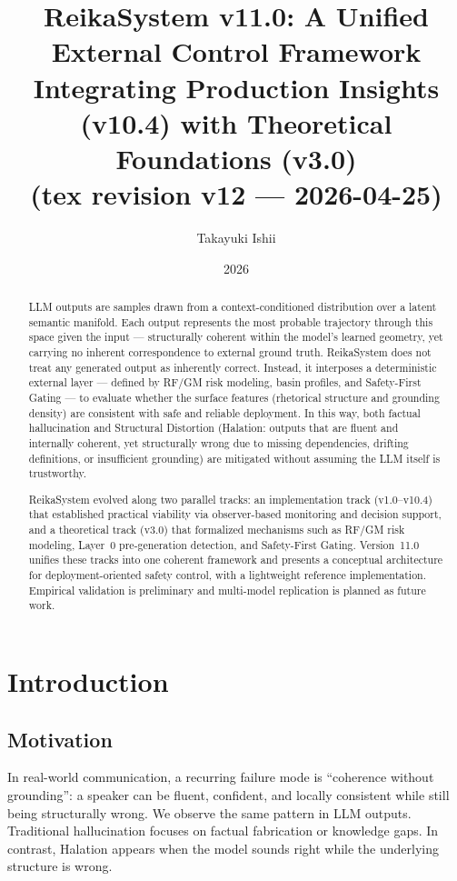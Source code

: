 \documentclass[11pt,a4paper]{article}
\title{ReikaSystem v11.0: A Unified External Control Framework\\
\large Integrating Production Insights (v10.4) with Theoretical Foundations (v3.0)
\\ \small (tex revision v12 --- 2026-04-25)}
\author{Takayuki Ishii}
\date{2026}
\begin{document}
\maketitle

\begin{abstract}
LLM outputs are samples drawn from a context-conditioned distribution over a latent semantic
manifold. Each output represents the most probable trajectory through this space given the
input --- structurally coherent within the model's learned geometry, yet carrying no inherent
correspondence to external ground truth.
ReikaSystem does not treat any generated output as inherently correct.
Instead, it interposes a deterministic external layer --- defined by RF/GM risk modeling,
basin profiles, and Safety-First Gating --- to evaluate whether the surface features
(rhetorical structure and grounding density) are consistent with safe and reliable deployment.
In this way, both factual hallucination and Structural Distortion (Halation: outputs that are
fluent and internally coherent, yet structurally wrong due to missing dependencies, drifting
definitions, or insufficient grounding) are mitigated without assuming the LLM itself is
trustworthy.

ReikaSystem evolved along two parallel tracks: an implementation track (v1.0--v10.4)
that established practical viability via observer-based monitoring and decision support, and
a theoretical track (v3.0) that formalized mechanisms such as RF/GM risk modeling, Layer~0
pre-generation detection, and Safety-First Gating. Version~11.0 unifies these tracks into one
coherent framework and presents a conceptual architecture for
deployment-oriented safety control, with a lightweight reference implementation. Empirical
validation is preliminary and multi-model replication is planned as future work.
\end{abstract}

\section{Introduction}

\subsection{Motivation}
In real-world communication, a recurring failure mode is ``coherence without grounding'': a
speaker can be fluent, confident, and locally consistent while still being structurally wrong.
We observe the same pattern in LLM outputs. Traditional hallucination focuses on factual
fabrication or knowledge gaps. In contrast, Halation appears when the model sounds right while
the underlying structure is wrong.
\end{document}
